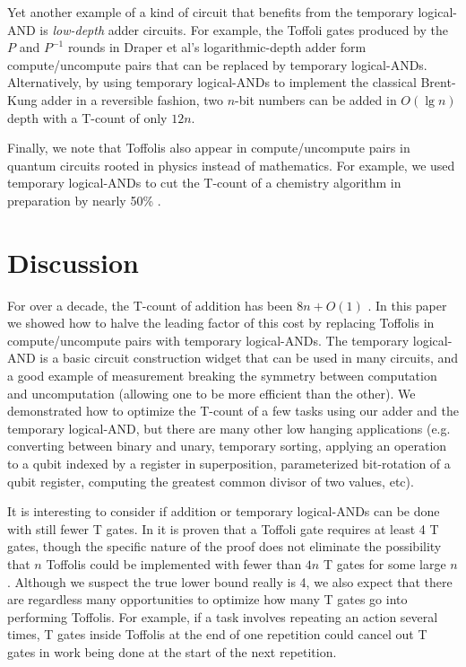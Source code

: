 \documentclass[twocolumn,accepted=2018-05-25]{quantumarticle}
\begin{document}
Yet another example of a kind of circuit that benefits from the temporary logical-AND is {\em low-depth} adder circuits.
For example, the Toffoli gates produced by the $P$ and $P^{-1}$ rounds in Draper et al's logarithmic-depth adder \cite{Draper2004} form compute/uncompute pairs that can be replaced by temporary logical-ANDs.
Alternatively, by using temporary logical-ANDs to implement the classical Brent-Kung adder \cite{brent1982} in a reversible fashion, two $n$-bit numbers can be added in $O(\lg n)$ depth with a T-count of only $12n$.

Finally, we note that Toffolis also appear in compute/uncompute pairs in quantum circuits rooted in physics instead of mathematics.
For example, we used temporary logical-ANDs to cut the T-count of a chemistry algorithm in preparation by nearly 50\% \cite{Babbush2018}.


\section*{Discussion}

For over a decade, the T-count of addition has been $8n + O(1)$ \cite{Amy2013, Barenco1995, Cuccaro2004}.
In this paper we showed how to halve the leading factor of this cost by replacing Toffolis in compute/uncompute pairs with temporary logical-ANDs.
The temporary logical-AND is a basic circuit construction widget that can be used in many circuits, and a good example of measurement breaking the symmetry between computation and uncomputation (allowing one to be more efficient than the other).
We demonstrated how to optimize the T-count of a few tasks using our adder and the temporary logical-AND, but there are many other low hanging applications (e.g. converting between binary and unary, temporary sorting, applying an operation to a qubit indexed by a register in superposition, parameterized bit-rotation of a qubit register, computing the greatest common divisor of two values, etc).

It is interesting to consider if addition or temporary logical-ANDs can be done with still fewer T gates.
In \cite{Howard2017} it is proven that a Toffoli gate requires at least 4 T gates, though the specific nature of the proof does not eliminate the possibility that $n$ Toffolis could be implemented with fewer than $4n$ T gates for some large $n$.
Although we suspect the true lower bound really is 4, we also expect that there are regardless many opportunities to optimize how many T gates go into performing Toffolis.
For example, if a task involves repeating an action several times, T gates inside Toffolis at the end of one repetition could cancel out T gates in work being done at the start of the next repetition.
\end{document}
